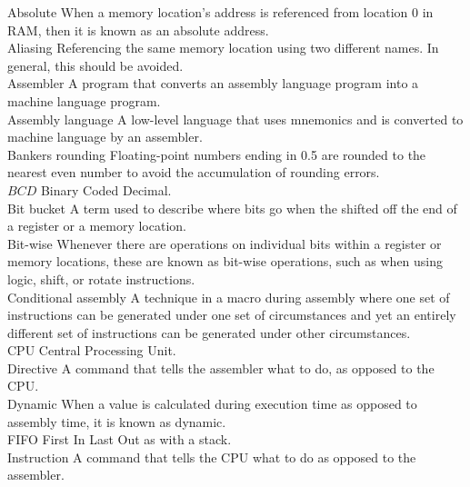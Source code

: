 \documentclass[10pt]{book}
\begin{document}
\begin{center}
\begin{center}
\begin{center}
\begin{center}
\begin{center}
Absolute When a memory location's address is referenced from location 0 in RAM, then it is known as an absolute address.\\
Aliasing Referencing the same memory location using two different names. In general, this should be avoided.\\
Assembler A program that converts an assembly language program into a machine language program.\\
Assembly language A low-level language that uses mnemonics and is converted to machine language by an assembler.\\
Bankers rounding Floating-point numbers ending in 0.5 are rounded to the nearest even number to avoid the accumulation of rounding errors.\\
$B C D$ Binary Coded Decimal.\\
Bit bucket A term used to describe where bits go when the shifted off the end of a register or a memory location.\\
Bit-wise Whenever there are operations on individual bits within a register or memory locations, these are known as bit-wise operations, such as when using logic, shift, or rotate instructions.\\
Conditional assembly A technique in a macro during assembly where one set of instructions can be generated under one set of circumstances and yet an entirely different set of instructions can be generated under other circumstances.\\
CPU Central Processing Unit.\\
Directive A command that tells the assembler what to do, as opposed to the CPU.\\
Dynamic When a value is calculated during execution time as opposed to assembly time, it is known as dynamic.\\
FIFO First In Last Out as with a stack.\\
Instruction A command that tells the CPU what to do as opposed to the assembler.


\end{center}
\end{center}
\end{center}
\end{center}
\end{center}
\end{document}
